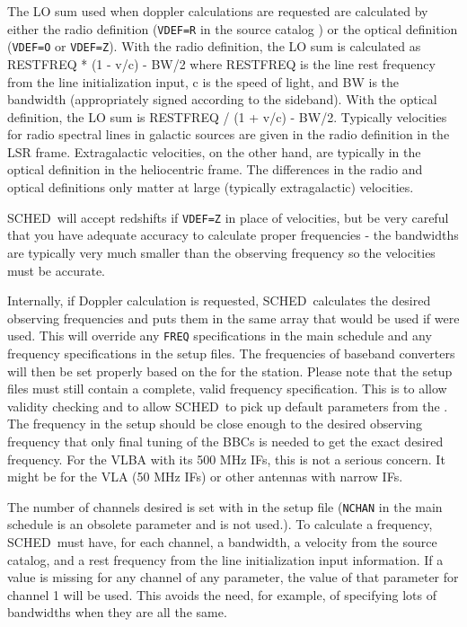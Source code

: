 \documentclass{report}
\newcommand{\schedb}{{\sc SCHED~}}
\begin{document}
The LO sum used when doppler calculations are requested are calculated
by either the radio definition ({\tt VDEF=R} in the source catalog )
or the optical definition ({\tt VDEF=O} or {\tt VDEF=Z}). With the
radio definition, the LO sum is calculated as RESTFREQ * (1 - v/c) -
BW/2 where RESTFREQ is the line rest frequency from the line
initialization input, c is the speed of light, and BW is the bandwidth
(appropriately signed according to the sideband).  With the optical
definition, the LO sum is RESTFREQ / (1 + v/c) - BW/2.  Typically
velocities for radio spectral lines in galactic sources are given in
the radio definition in the LSR frame.  Extragalactic velocities, on
the other hand, are typically in the optical definition in the
heliocentric frame.  The differences in the radio and optical
definitions only matter at large (typically extragalactic) velocities.

\schedb will accept redshifts if {\tt VDEF=Z} in place of
velocities, but be very careful that you have adequate accuracy
to calculate proper frequencies - the bandwidths are typically
very much smaller than the observing frequency so the velocities
must be accurate.

Internally, if Doppler calculation is requested, \schedb calculates
the desired observing frequencies and puts them in the same array that
would be used if  were used. This will
override any {\tt FREQ} specifications in the main schedule and any
frequency specifications in the setup files.  The frequencies of
baseband converters will then be set properly based on the
 for the station.  Please note that
the setup files must still contain a complete, valid frequency
specification.  This is to allow validity checking and to allow
\schedb to pick up default parameters from the
.  The frequency in the setup
should be close enough to the desired observing frequency that only
final tuning of the BBCs is needed to get the exact desired frequency.
For the VLBA with its 500 MHz IFs, this is not a serious concern.  It
might be for the VLA (50 MHz IFs) or other antennas with narrow IFs.

The number of channels desired is set with  in the setup file ({\tt NCHAN} in the main schedule
is an obsolete parameter and is not used.).  To calculate a frequency,
\schedb must have, for each channel, a bandwidth, a velocity from
the source catalog, and a rest frequency from the line initialization
input information.  If a value is missing for any channel of any
parameter, the value of that parameter for channel 1 will be
used. This avoids the need, for example, of specifying lots of
bandwidths when they are all the same.
\end{document}
